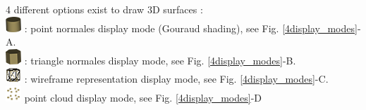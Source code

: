 4 different options exist to draw 3D surfaces :\\
\includegraphics[scale=0.7]{images/06/display/point_normales.png} : point normales display mode (Gouraud shading), see Fig. \ref{4display_modes}-A.\\
\includegraphics[scale=0.7]{images/06/display/cell_normales.png} : triangle normales display mode, see Fig. \ref{4display_modes}-B. \\
\includegraphics[scale=0.7]{images/06/display/wireframe.png} : wireframe representation  display mode, see Fig. \ref{4display_modes}-C.\\
\includegraphics[scale=0.7]{images/06/display/points.png} point cloud display mode, see Fig. \ref{4display_modes}-D\\

